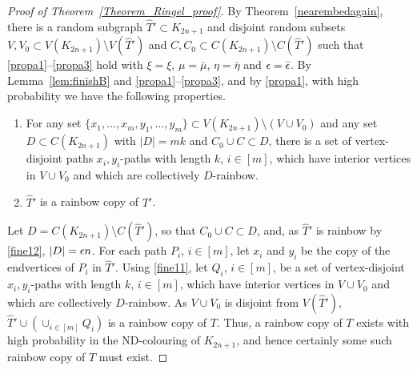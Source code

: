 \begin{proof}[Proof of Theorem~\ref{Theorem_Ringel_proof}]
 By Theorem~\ref{nearembedagain}, there is a random subgraph $\hat{T}'\subset K_{2n+1}$ and disjoint random subsets $V,V_0\subset V(K_{2n+1})\setminus V(\hat{T}')$ and $C,C_0\subset C(K_{2n+1})\setminus C(\hat{T}')$ such that \ref{propa1}--\ref{propa3} hold with $\xi=\xi$, $\mu=\bar{\mu}$, $\eta=\bar{\eta}$ and $\epsilon=\bar{\epsilon}$. By Lemma~\ref{lem:finishB} and \ref{propa1}--\ref{propa3}, and by \ref{propa1}, with high probability we have the following properties.
\begin{enumerate}[label = {\bfseries \Alph{propcounter}\arabic{enumi}}]
\item For any set $\{x_1,\ldots,x_m,y_1,\ldots,y_m\}\subset V(K_{2n+1})\setminus (V\cup V_0)$ and any set $D\subset C(K_{2n+1})$ with $|D|=mk$ and $C_0\cup C\subset D$, there is a set of vertex-disjoint paths $x_i,y_i$-paths with length $k$, $i\in [m]$, which have interior vertices in $V\cup V_0$ and which are collectively $D$-rainbow.\label{fine11}
\item $\hat{T}'$ is a rainbow copy of $T'$.\label{fine12}
\end{enumerate}
Let $D=C(K_{2n+1})\setminus C(\hat{T}')$, so that $C_0\cup C\subset D$, and, as $\hat{T}'$ is rainbow by \ref{fine12}, $|D|=\epsilon n$.
For each path $P_i$, $i\in [m]$, let $x_i$ and $y_i$ be the copy of the endvertices of $P_i$ in $\hat{T}'$. Using \ref{fine11}, let $Q_i$, $i\in [m]$, be a set of vertex-disjoint $x_i,y_i$-paths with length $k$, $i\in [m]$, which have interior vertices in $V\cup V_0$ and which are collectively $D$-rainbow. As $V\cup V_0$ is disjoint from $V(\hat{T}')$,
 $\hat{T}'\cup (\cup_{i\in [m]}Q_i)$ is a rainbow copy of $T$. Thus, a rainbow copy of $T$ exists with high probability in the ND-colouring of $K_{2n+1}$, and hence certainly some such rainbow copy of $T$ must exist.
\end{proof}

